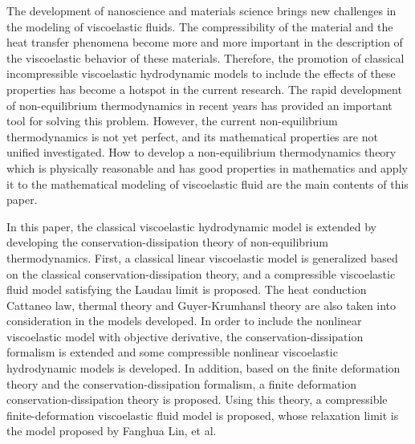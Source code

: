 \begin{eabstract}
  \noindent The development of nanoscience and materials science brings new challenges in the modeling of viscoelastic fluids. The compressibility of the material and the heat transfer phenomena become more and more important in the description of the viscoelastic behavior of these materials. Therefore, the promotion of classical incompressible viscoelastic hydrodynamic models to include the effects of these properties has become a hotspot in the current research. The rapid development of non-equilibrium thermodynamics in recent years has provided an important tool for solving this problem. However, the current non-equilibrium thermodynamics is not yet perfect, and its mathematical properties are not unified investigated. How to develop a non-equilibrium thermodynamics theory which is physically reasonable and has good properties in mathematics and apply it to the mathematical modeling of viscoelastic fluid are the main contents of this paper.
  
  In this paper, the classical viscoelastic hydrodynamic model is extended by developing the conservation-dissipation theory of non-equilibrium thermodynamics. First, a classical linear viscoelastic model is generalized based on the classical conservation-dissipation theory, and a compressible viscoelastic fluid model satisfying the Laudau limit is proposed. The heat conduction Cattaneo law, thermal theory and Guyer-Krumhansl theory are also taken into consideration in the models developed. In order to include the nonlinear viscoelastic model with objective derivative, the conservation-dissipation formalism is extended and some compressible nonlinear viscoelastic hydrodynamic models is developed. In addition, based on the finite deformation theory and the conservation-dissipation formalism, a finite deformation conservation-dissipation theory is proposed. Using this theory, a compressible finite-deformation viscoelastic fluid model is proposed, whose relaxation limit is the model proposed by Fanghua Lin, et al.


\end{eabstract}
